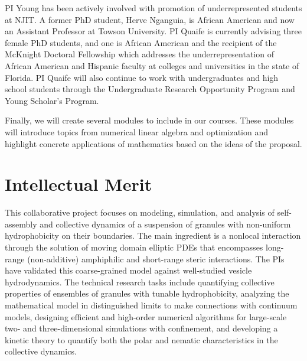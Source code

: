 PI Young has been actively involved with promotion of underrepresented
students at NJIT. A former PhD student, Herve Nganguia, is African
American and now an Assistant Professor at Towson University. PI Quaife
is currently advising three female PhD students, and one is African
American and the recipient of the McKnight Doctoral Fellowship which
addresses the underrepresentation of African American and Hispanic
faculty at colleges and universities in the state of Florida. PI Quaife
will also continue to work with undergraduates and high school students
through the Undergraduate Research Opportunity Program and Young
Scholar's Program.

Finally, we will create several modules to include in our courses. These
modules will introduce topics from numerical linear algebra and
optimization and highlight concrete applications of mathematics based on
the ideas of the proposal.

\section{Intellectual Merit}
\label{sec:IntellectualMerit}
This collaborative project focuses on modeling, simulation, and analysis
of self-assembly and collective dynamics of a suspension of granules
with non-uniform hydrophobicity on their boundaries. The main ingredient
is a nonlocal interaction through the solution of moving domain elliptic
PDEs that encompasses long-range (non-additive) amphiphilic and
short-range steric interactions. The PIs have validated this
coarse-grained model against well-studied vesicle hydrodynamics. The
technical research tasks include quantifying collective properties of
ensembles of granules with tunable hydrophobicity, analyzing the
mathematical model in distinguished limits to make connections with
continuum models, designing efficient and high-order numerical
algorithms for large-scale two- and three-dimensional simulations with
confinement, and developing a kinetic theory to quantify both the polar
and nematic characteristics in the collective dynamics.

